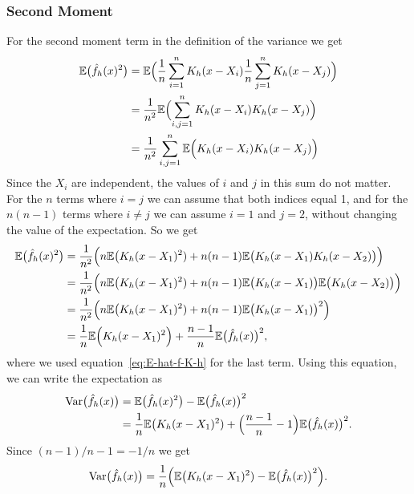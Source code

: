 \documentclass[
  a4paper,
]{article}
\theoremstyle{definition}
\theoremstyle{definition}
\theoremstyle{definition}
\theoremstyle{definition}
\theoremstyle{remark}
\begin{document}
\hypertarget{second-moment}{%
\subsubsection{Second Moment}\label{second-moment}}

For the second moment term in the definition of the variance we get
\begin{align*}
  \mathbb{E}\bigl( \hat f_h(x)^2 \bigr)
  &= \mathbb{E}\Bigl( \frac{1}{n} \sum_{i=1}^n K_h(x - X_i) \frac{1}{n} \sum_{j=1}^n K_h(x - X_j) \Bigr) \\
  &= \frac{1}{n^2} \mathbb{E}\Bigl( \sum_{i,j=1}^n K_h(x - X_i) K_h(x - X_j) \Bigr) \\
  &= \frac{1}{n^2} \sum_{i,j=1}^n \mathbb{E}\Bigl( K_h(x - X_i) K_h(x - X_j) \Bigr)
\end{align*}
Since the \(X_i\) are independent, the values of \(i\) and \(j\) in this sum do not
matter. For the \(n\) terms where \(i=j\) we can assume that both indices equal
1, and for the \(n(n-1)\) terms where \(i\neq j\) we can assume \(i=1\) and \(j=2\),
without changing the value of the expectation. So we get
\begin{align*}
  \mathbb{E}\bigl( \hat f_h(x)^2 \bigr)
  &= \frac{1}{n^2} \Bigl( n \mathbb{E}\bigl( K_h(x - X_1)^2 ) + n(n-1) \mathbb{E}\bigl( K_h(x - X_1) K_h(x - X_2) \bigr) \Bigr) \\
  &= \frac{1}{n^2} \Bigl( n \mathbb{E}\bigl( K_h(x - X_1)^2 ) + n(n-1) \mathbb{E}\bigl( K_h(x - X_1) \bigr) \mathbb{E}\bigl( K_h(x - X_2) \bigr) \Bigr) \\
  &= \frac{1}{n^2} \Bigl( n \mathbb{E}\bigl( K_h(x - X_1)^2 ) + n(n-1) \mathbb{E}\bigl( K_h(x - X_1) \bigr)^2 \Bigr) \\
  &= \frac{1}{n} \mathbb{E}\Bigl( K_h(x - X_1)^2 \Bigr) + \frac{n-1}{n} \mathbb{E}\bigl( \hat f_h(x) \bigr)^2,
\end{align*}
where we used equation~\eqref{eq:E-hat-f-K-h} for the last term.
Using this equation, we can write the expectation as
\begin{align*}
  \mathop{\mathrm{Var}}\bigl( \hat f_h(x) \bigr)
  &= \mathbb{E}\bigl( \hat f_h(x)^2 \bigr) - \mathbb{E}\bigl( \hat f_h(x) \bigr)^2 \\
  &= \frac{1}{n} \mathbb{E}\bigl( K_h(x - X_1)^2 ) + \Bigl(\frac{n-1}{n} - 1\Bigr) \mathbb{E}\bigl( \hat f_h(x) \bigr)^2.
\end{align*}
Since \((n-1)/n - 1 = -1/n\) we get
\begin{equation}
  \mathop{\mathrm{Var}}\bigl( \hat f_h(x) \bigr)
  = \frac{1}{n} \Bigl( \mathbb{E}\bigl( K_h(x - X_1)^2 ) - \mathbb{E}\bigl( \hat f_h(x) \bigr)^2 \Bigr).
                                                          \label{eq:Var-hat-f-2}
\end{equation}
\end{document}
